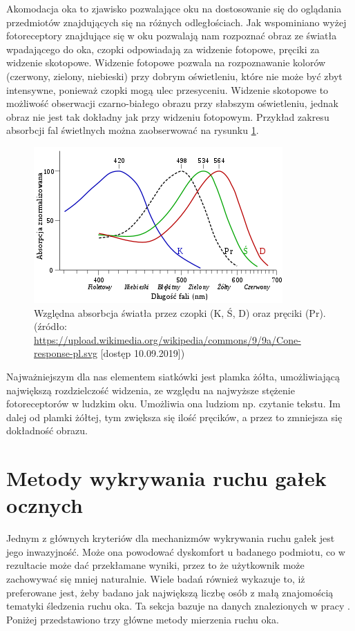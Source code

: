 Akomodacja oka to zjawisko pozwalające oku na dostosowanie się do oglądania przedmiotów znajdujących się na różnych odległościach. Jak wspominiano wyżej fotoreceptory znajdujące się w oku pozwalają nam rozpoznać obraz ze światła wpadającego do oka, czopki odpowiadają za widzenie fotopowe, pręciki za widzenie skotopowe. Widzenie fotopowe pozwala na rozpoznawanie kolorów (czerwony, zielony, niebieski) przy dobrym oświetleniu, które nie może być zbyt intensywne, ponieważ czopki mogą ulec przesyceniu. Widzenie skotopowe to możliwość obserwacji czarno-białego obrazu przy słabszym oświetleniu, jednak obraz nie jest tak dokładny jak przy widzeniu fotopowym. Przykład zakresu absorbcji fal świetlnych można zaobserwować na rysunku \ref{fig:czopki}.
\begin{figure}[H]
    \centering
    \captionsetup{justification=centering,margin=2cm}
    \includegraphics[width=0.9\linewidth]{resources/czopki.png}
    \caption[Względna absorbcja światła przez czopki oraz pręciki.]{Względna absorbcja światła przez czopki (K, Ś, D) oraz pręciki (Pr).\\\hspace{\textwidth}
    \small(źródło: \url{https://upload.wikimedia.org/wikipedia/commons/9/9a/Cone-response-pl.svg} [dostęp 10.09.2019])}
    \label{fig:czopki}
\end{figure}
Najważniejszym dla nas elementem siatkówki jest plamka żółta, umożliwiającą największą rozdzielczość widzenia, ze względu na najwyższe stężenie fotoreceptorów w ludzkim oku. Umożliwia ona ludziom np. czytanie tekstu. Im dalej od plamki żółtej, tym zwiększa się ilość pręcików, a przez to zmniejsza się dokładność obrazu.
\section{Metody wykrywania ruchu gałek ocznych}
\label{sec:movement}
Jednym z głównych kryteriów dla mechanizmów wykrywania ruchu gałek jest jego inwazyjność. Może ona powodować dyskomfort u badanego podmiotu, co w rezultacie może dać przekłamane wyniki, przez to że użytkownik może zachowywać się mniej naturalnie. Wiele badań również wykazuje to, iż preferowane jest, żeby badano jak największą liczbę osób z małą znajomością tematyki śledzenia ruchu oka. Ta sekcja bazuje na danych znalezionych w pracy \cite{metodyeyetrack}. Poniżej przedstawiono trzy główne metody mierzenia ruchu oka.\\
